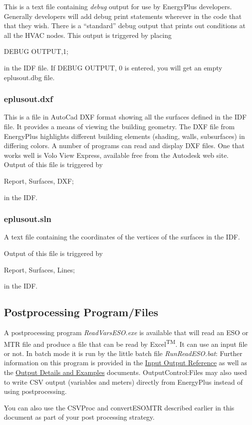 This is a text file containing \emph{debug} output for use by EnergyPlus developers. Generally developers will add debug print statements wherever in the code that that they wish. There is a ``standard'' debug output that prints out conditions at all the HVAC nodes. This output is triggered by placing

DEBUG OUTPUT,1;

in the IDF file. If DEBUG OUTPUT, 0 is entered, you will get an empty eplusout.dbg file.

\subsubsection{eplusout.dxf}\label{eplusout.dxf}

This is a file in AutoCad DXF format showing all the surfaces defined in the IDF file. It provides a means of viewing the building geometry. The DXF file from EnergyPlus highlights different building elements (shading, walls, subsurfaces) in differing colors. A number of programs can read and display DXF files. One that works well is Volo View Express, available free from the Autodesk web site. Output of this file is triggered by

Report, Surfaces, DXF;

in the IDF.

\subsubsection{eplusout.sln}\label{eplusout.sln}

A text file containing the coordinates of the vertices of the surfaces in the IDF.

Output of this file is triggered by

Report, Surfaces, Lines;

in the IDF.

\subsection{Postprocessing Program/Files}\label{postprocessing-programfiles-000}

A postprocessing program \emph{ReadVarsESO.exe} is available that will read an ESO or MTR file and produce a file that can be read by Excel\textsuperscript{TM}. It can use an input file or not. In batch mode it is run by the little batch file \emph{RunReadESO.bat}: Further information on this program is provided in the \href{InputOutputReference.pdf}{Input Output Reference} as well as the \href{OutputDetailsAndExamples.pdf}{Output Details and Examples} documents. OutputControl:Files may also used to write CSV output (variables and meters) directly from EnergyPlus instead of using postprocessing.

You can also use the CSVProc and convertESOMTR described earlier in this document as part of your post processing strategy.
